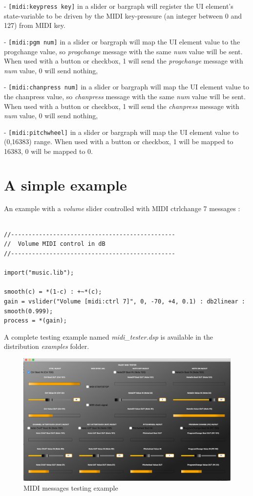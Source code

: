 - \lstinline'[midi:keypress key]' in a slider or bargraph will
register the UI element's state-variable to be driven by the MIDI
key-pressure (an integer between 0 and 127) from MIDI key.

- \lstinline'[midi:pgm num]' in a slider or bargraph will map the UI element value to the progchange value, so \emph{progchange} message with the same \emph{num} value will be sent. When used with a button or checkbox, 1 will send the \emph{progchange} message with \emph{num} value, 0 will send nothing,

- \lstinline'[midi:chanpress num]' in a slider or bargraph will map the UI element value to the chanpress value, so \emph{chanpress} message with the same \emph{num} value will be sent. When used with a button or checkbox, 1 will send the \emph{chanpress} message with \emph{num} value, 0 will send nothing,

- \lstinline'[midi:pitchwheel]' in a slider or bargraph will map the UI element value to (0,16383) range. When used with a button or checkbox, 1 will be mapped to 16383, 0 will be mapped to 0.

\section{A simple example}

An example with a \emph{volume} slider controlled with MIDI ctrlchange 7 messages :

\begin{lstlisting}

//-----------------------------------------------
//  Volume MIDI control in dB
//-----------------------------------------------

import("music.lib");

smooth(c) = *(1-c) : +~*(c);
gain = vslider("Volume [midi:ctrl 7]", 0, -70, +4, 0.1) : db2linear : smooth(0.999);
process = *(gain);

\end{lstlisting}

A complete testing example named  \emph{midi\_tester.dsp}  is available in the \faust distribution \emph{examples} folder.

\begin{figure}[h!]
  \centering
  \includegraphics[width=\textwidth]{images/midi-tester.png}
  \caption{MIDI messages testing example}   
  \label{fig:midi-tester}
\end{figure}

